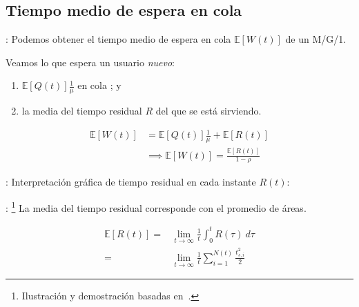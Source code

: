 \documentclass[xcolor={x11names}]{beamer}
\begin{document}
\subsection{Tiempo medio de espera en cola}
\begin{frame}{\secname: \subsecname}
    Podemos obtener el tiempo medio
    de espera en cola $\mathbb{E}[W(t)]$ de
    un M/G/1.
    \begin{figure}
        
    \end{figure}
    Veamos lo que espera un usuario
    \emph{nuevo}:
    \begin{enumerate}
        \item $\mathbb{E}[Q(t)]\tfrac{1}{\mu}$
            en cola ; y
        \item la media del tiempo residual
            $R$ del que
            se está sirviendo.
    \end{enumerate}
    \begin{align*}
        \mathbb{E}[W(t)]&=
        \mathbb{E}[Q(t)]\tfrac{1}{\mu}
        + \mathbb{E}[R(t)]\\
        &\implies \mathbb{E}[W(t)]=
        \frac{\mathbb{E}[R(t)]}{1-\rho}
    \end{align*}
\end{frame}




\begin{frame}{\secname: \subsecname}
    Interpretación gráfica de tiempo
    residual en cada instante $R(t)$:
    \begin{figure}
        
    \end{figure}
\end{frame}



\begin{frame}{\secname: \subsecname}
    \footnote{
    Ilustración y demostración basadas
    en~\cite[Figura 8.3]{amable}.}
    La media del tiempo residual corresponde
    con el promedio de áreas.
    \begin{figure}
        
    \end{figure}
    \begin{align*}
        \mathbb{E}[R(t)]=&\lim_{t\to\infty}
        \frac{1}{t}\int_0^t
        R(\tau)\ d\tau\\
        =& \lim_{t\to\infty} \frac{1}{t}
        \sum_{i=1}^{N(t)} \frac{t_{s,i}^2}{2}
    \end{align*}
\end{frame}
\end{document}
